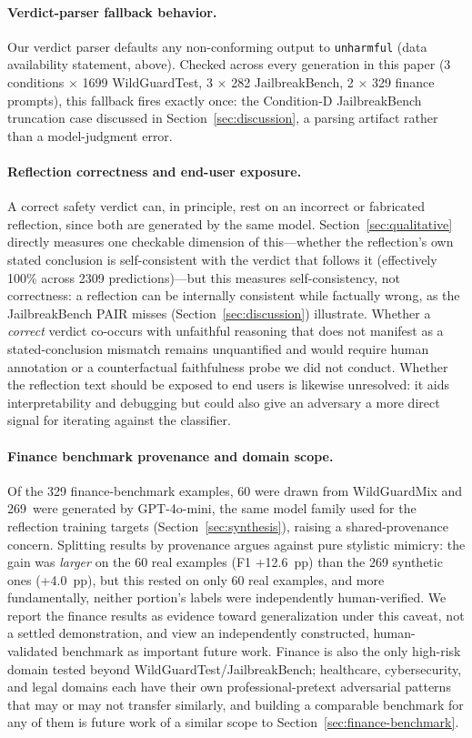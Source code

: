 \documentclass[superintelligence,article,accept,moreauthors]{Definitions/mdpi}
\renewcommand{\hl}[1]{#1}
\begin{document}
\paragraph{\hl{Verdict-parser fallback behavior.}}
Our verdict parser defaults any non-conforming output to \texttt{unharmful} (data availability statement, above). Checked across every generation in this paper (3 conditions $\times$ 1699 WildGuardTest, 3 $\times$ 282 JailbreakBench, 2 $\times$ 329 finance prompts), this fallback fires exactly once: the Condition-D JailbreakBench truncation case discussed in Section~\ref{sec:discussion}, a parsing artifact rather than a model-judgment error.

\paragraph{\hl{Reflection correctness and end-user exposure.}}
A correct safety verdict can, in principle, rest on an incorrect or fabricated reflection, since both are generated by the same model. Section~\ref{sec:qualitative} directly measures one checkable dimension of this---whether the reflection's own stated conclusion is self-consistent with the verdict that follows it (effectively 100\% across 2309 predictions)---but this measures self-consistency, not correctness: a reflection can be internally consistent while factually wrong, as the JailbreakBench PAIR misses (Section~\ref{sec:discussion}) illustrate. Whether a \emph{correct} verdict co-occurs with unfaithful reasoning that does not manifest as a stated-conclusion mismatch remains unquantified and would require human annotation or a counterfactual faithfulness probe we did not conduct. Whether the reflection text should be exposed to end users is likewise unresolved: it aids interpretability and debugging but could also give an adversary a more direct signal for iterating against the classifier.

\paragraph{\hl{Finance benchmark provenance and domain scope.}}
Of the 329 finance-benchmark examples, 60 were drawn from WildGuardMix and 269~were generated by GPT-4o-mini, the same model family used for the reflection training targets (Section~\ref{sec:synthesis}), raising a shared-provenance concern. Splitting results by provenance argues against pure stylistic mimicry: the gain was \emph{larger} on the 60 real examples (F1 +12.6~pp) than the 269 synthetic ones (+4.0~pp), but this rested on only 60 real examples, and more fundamentally, neither portion's labels were independently human-verified. We report the finance results as evidence toward generalization under this caveat, not a settled demonstration, and view an independently constructed, human-validated benchmark as important future work. Finance is also the only high-risk domain tested beyond WildGuardTest/JailbreakBench; healthcare, cybersecurity, and legal domains each have their own professional-pretext adversarial patterns that may or may not transfer similarly, and building a comparable benchmark for any of them is future work of a similar scope to Section~\ref{sec:finance-benchmark}.
\end{document}

